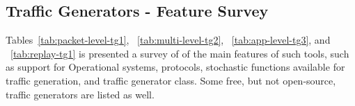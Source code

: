 \subsection{Traffic Generators - Feature Survey}


Tables~\ref{tab:packet-level-tg1}, ~\ref{tab:multi-level-tg2}, ~\ref{tab:app-level-tg3}, and ~\ref{tab:replay-tg1} is presented a survey of of the main features of such tools, such as support for Operational systems, protocols, stochastic functions available for traffic generation, and traffic generator class. Some free, but not open-source, traffic generators are listed as well. 

